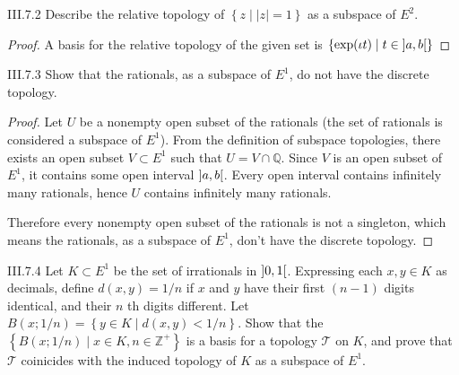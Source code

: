 \begin{problem}{III.7.2}
Describe the relative topology of \( \left\{ z \mid \left\vert{z}\right\vert = 1 \right\} \) as a subspace of \(E^{2}\).
\end{problem}

\begin{proof}
	A basis for the relative topology of the given set is \( \left\{ \exp(\iota t) \mid t \in \left]{a,b}\right[ \right\} \)
\end{proof}

\begin{problem}{III.7.3}
Show that the rationals, as a subspace of \(E^{1}\), do not have the discrete topology.
\end{problem}

\begin{proof}
	Let \(U\) be a nonempty open subset of the rationals (the set of rationals is considered a subspace of \(E^{1}\)). From the definition of subspace topologies, there exists an open subset \(V \subset E^{1}\) such that \(U = V \cap \mathbb{Q}\). Since \(V\) is an open subset of \(E^{1}\), it contains some open interval \(\left]{a, b}\right[\). Every open interval contains infinitely many rationals, hence \(U\) contains infinitely many rationals.

	Therefore every nonempty open subset of the rationals is not a singleton, which means the rationals, as a subspace of \(E^{1}\), don't have the discrete topology.
\end{proof}

\begin{problem}{III.7.4}
Let \(K \subset E^{1}\) be the set of irrationals in \( \left]{0,1}\right[ \). Expressing each \(x, y\in K\) as decimals, define \( d(x, y) = 1/n \) if \(x\) and \(y\) have their first \( (n - 1) \) digits identical, and their \(n\) th digits different. Let \( B(x; 1/n) = \left\{ y \in K \mid d(x, y) < 1/n \right\} \). Show that the \( \left\{ B(x; 1/n) \mid x \in K, n \in \mathbb{Z}^{+} \right\} \) is a basis for a topology \( \mathscr{T} \) on \(K\), and prove that \( \mathscr{T} \) coinicides with the induced topology of \(K\) as a subspace of \(E^{1}\).
\end{problem}

